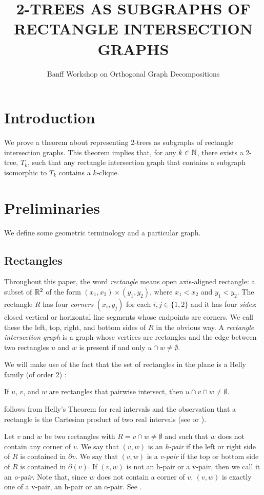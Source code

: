\documentclass[lotsofwhite]{patmorin}
\title{\MakeUppercase{2-Trees as Subgraphs of Rectangle Intersection Graphs}}
\author{Banff Workshop on Orthogonal Graph Decompositions}
\begin{document}
\maketitle

\section{Introduction}

We prove a theorem about representing 2-trees as subgraphs of rectangle
intersection graphs. This theorem implies that, for any $k\in\mathbb{N}$, there
exists a 2-tree, $T_k$, such that any rectangle intersection graph that
contains a subgraph isomorphic to $T_k$ contains a $k$-clique.

\section{Preliminaries}

We define some geometric terminology and a particular graph.

\subsection{Rectangles}

Throughout this paper, the word \emph{rectangle} means open axis-aligned
rectangle: a subset of $\mathbb{R}^2$ of the form $(x_1,x_2)\times (y_1,y_2)$,
where $x_1<x_2$ and $y_1<y_2$.  The rectangle $R$ has four \emph{corners}
$(x_i,y_j)$ for each $i,j\in\{1,2\}$ and it has four \emph{sides}: closed
vertical or horizontal line segments whose endpoints are corners.  We call
these the left, top, right, and bottom sides of $R$ in the obvious way.
A \emph{rectangle intersection graph} is a graph whose vertices are
rectangles and the edge between two rectangles $u$ and $w$ is present
if and only $u\cap w\neq \emptyset$.

We will make use of the fact that the set of rectangles in the plane is
a Helly family (of order 2) \cite[Chapter~11]{bollobas:combinatorics}:
\begin{obs}
   If $u$, $v$, and $w$ are rectangles that pairwise intersect, then
   $u\cap v\cap w\neq\emptyset$.
\end{obs}
 follows from Helly's Theorem for real intervals
and the observation that a rectangle is the Cartesian product of
two real intervals (see \cite[Page~83]{bollobas:combinatorics} or
\cite{bollobas.duchet:helly}).

Let $v$ and $w$ be two rectangles with $R=v\cap w\neq \emptyset$ and
such that $w$ does not contain any corner of $v$.  We say that $(v,w)$
is an \emph{h-pair} if the left or right side of $R$ is contained in
$\partial v$.  We say that $(v,w)$ is a \emph{v-pair} if the top or bottom
side of $R$ is contained in $\partial(v)$.  If $(v,w)$ is not an h-pair
or a v-pair, then we call it an \emph{o-pair}.  Note that, since $w$
does not contain a corner of $v$, $(v,w)$ is exactly one of a v-pair,
an h-pair or an o-pair. See .
\end{document}
